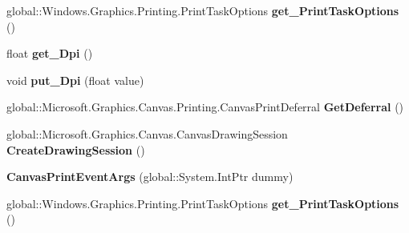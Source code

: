 \begin{DoxyCompactItemize}
\mbox{\label{class_microsoft_1_1_graphics_1_1_canvas_1_1_printing_1_1_canvas_print_event_args_ad5b73bb8902c264570280b8d32de248a}} 
global\+::\+Windows.\+Graphics.\+Printing.\+Print\+Task\+Options {\bfseries get\+\_\+\+Print\+Task\+Options} ()
\item 
\mbox{\label{class_microsoft_1_1_graphics_1_1_canvas_1_1_printing_1_1_canvas_print_event_args_a489419324969512ed6bcc06da051d2b8}} 
float {\bfseries get\+\_\+\+Dpi} ()
\item 
\mbox{\label{class_microsoft_1_1_graphics_1_1_canvas_1_1_printing_1_1_canvas_print_event_args_a5f0f1ae61467f9da31d3133fae0a7413}} 
void {\bfseries put\+\_\+\+Dpi} (float value)
\item 
\mbox{\label{class_microsoft_1_1_graphics_1_1_canvas_1_1_printing_1_1_canvas_print_event_args_a2e052fa5533258995ffc08b251a211d5}} 
global\+::\+Microsoft.\+Graphics.\+Canvas.\+Printing.\+Canvas\+Print\+Deferral {\bfseries Get\+Deferral} ()
\item 
\mbox{\label{class_microsoft_1_1_graphics_1_1_canvas_1_1_printing_1_1_canvas_print_event_args_a02bc922ffbfd6f4208853d6a3a2f0f4e}} 
global\+::\+Microsoft.\+Graphics.\+Canvas.\+Canvas\+Drawing\+Session {\bfseries Create\+Drawing\+Session} ()
\item 
\mbox{\label{class_microsoft_1_1_graphics_1_1_canvas_1_1_printing_1_1_canvas_print_event_args_ab71de59113b5cb4d0d36f0a663ad75b5}} 
{\bfseries Canvas\+Print\+Event\+Args} (global\+::\+System.\+Int\+Ptr dummy)
\item 
\mbox{\label{class_microsoft_1_1_graphics_1_1_canvas_1_1_printing_1_1_canvas_print_event_args_ad5b73bb8902c264570280b8d32de248a}} 
global\+::\+Windows.\+Graphics.\+Printing.\+Print\+Task\+Options {\bfseries get\+\_\+\+Print\+Task\+Options} ()

\end{DoxyCompactItemize}
